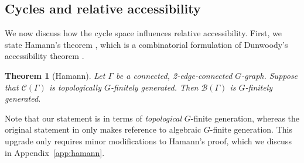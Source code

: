 \documentclass[11pt,a4paper]{amsart}
\newcommand{\onto}{\twoheadrightarrow}
\newtheorem{theorem}{Theorem}[section]%
\newtheorem{proposition}[theorem]{Proposition}
\theoremstyle{definition}
\newcommand{\per}{\mathcal{H}}
\newcommand{\br}{{\mathscr{B}}}
\newcommand{\cyc}{\mathscr{C}}
\begin{document}


    






\subsection{Cycles and relative accessibility}

We now discuss how the cycle space influences relative accessibility. First, we state Hamann's theorem \cite{hamann2018accessibility}, which is a combinatorial formulation of Dunwoody's accessibility theorem \cite{dunwoody1985accessibility}. 

\begin{theorem}[Hamann]\label{thm:hamann-top}
    Let $\Gamma$ be a connected, 2-edge-connected $G$-graph. Suppose that $\cyc(\Gamma)$ is topologically $G$-finitely generated. Then $\br(\Gamma)$ is $G$-finitely generated. 
\end{theorem}


Note that our statement is in terms of \emph{topological} $G$-finite generation, whereas the original statement in \cite{hamann2018accessibility} only makes reference to algebraic $G$-finite generation. This upgrade only requires minor modifications to Hamann's proof, which we discuss in Appendix~\ref{app:hamann}. 
\end{document}
